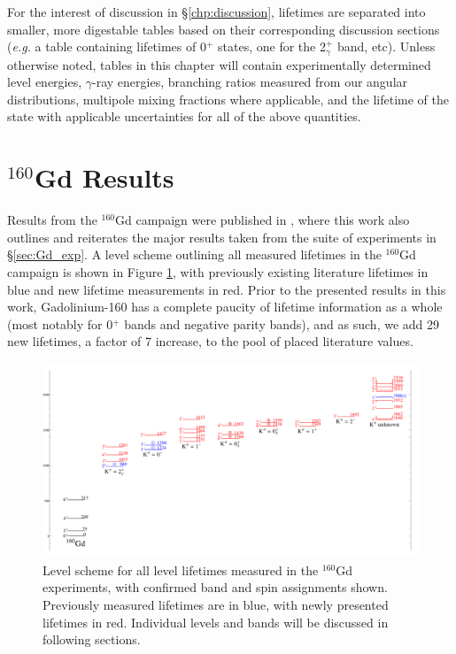 For the interest of discussion in \S \ref{chp:discussion}, lifetimes are separated into smaller, more digestable tables based on their corresponding discussion sections (\textit{e.g.} a table containing lifetimes of 0$^+$ states, one for the 2$^+_\gamma$ band, etc). Unless otherwise noted, tables in this chapter will contain experimentally determined level energies, $\gamma$-ray energies, branching ratios measured from our angular distributions, multipole mixing fractions where applicable, and the lifetime of the state with applicable uncertainties for all of the above quantities.
\section{$^{160}$Gd Results}
Results from the $^{160}$Gd campaign were published in \cite{Lesher_160Gd0s}, where this work also outlines and reiterates the major results taken from the suite of experiments in \S \ref{sec:Gd_exp}. A level scheme outlining all measured lifetimes in the $^{160}$Gd campaign is shown in Figure \ref{fig:160Gd_All}, with previously existing literature lifetimes in blue and new lifetime measurements in red. Prior to the presented results in this work, Gadolinium-160 has a complete paucity of lifetime information as a whole (most notably for 0$^+$ bands and negative parity bands), and as such, we add 29 new lifetimes, a factor of 7 increase, to the pool of placed literature values.

\begin{landscape}
\begin{center}
\begin{figure}[h!]
\includegraphics[height=0.85\textheight]{figures/160Gd_All.pdf}
\caption{Level scheme for all level lifetimes measured in the $^{160}$Gd experiments, with confirmed band and spin assignments shown. Previously measured lifetimes are in blue, with newly presented lifetimes in red. Individual levels and bands will be discussed in following sections.
\label{fig:160Gd_All}}
\end{figure}
\end{center}
\end{landscape}

